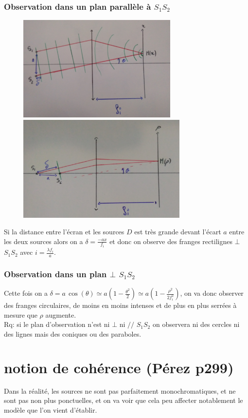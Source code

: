 \documentclass[12pt,prb,aps,epsf]{report}
\begin{document}
\subsubsection{Observation dans un plan parallèle à $S_1S_2$}
\begin{figure}[h]
	\centerline{ \includegraphics[width=8cm]{PparaS1S2}
				 \includegraphics[width=8.5cm]{PperpS1S2}}
\end{figure}

Si la distance entre l'écran et les sources $D$ est très grande devant l'écart $a$ entre les deux sources alors on a $\delta=\frac{-ax}{f_i}$ et donc on observe des franges rectilignes $\bot$ $S_1S_2$ avec $ i=\frac{\lambda f_i}{a}$.

\subsubsection{Observation dans un plan $\bot$ $S_1S_2$}

Cette fois on a $\delta=a\,\cos(\theta) \simeq a\left(1-\frac{\theta^2}{2}\right) \simeq a \left(1-\frac{\rho^2}{2f_i^2} \right) $, on va donc observer des franges circulaires, de moins en moins intenses et de plus en plus serrées à mesure que $\rho$ augmente.\\

Rq: si le plan d'observation n'est ni $\bot$ ni $//$ $S_1S_2$ on observera ni des cercles ni des lignes mais des coniques ou des paraboles.

\section{notion de cohérence (Pérez p299)}
Dans la réalité, les sources ne sont pas parfaitement monochromatiques, et ne sont pas non plus ponctuelles, et on va voir que cela peu affecter notablement le modèle que l'on vient d'établir. 
\end{document}
